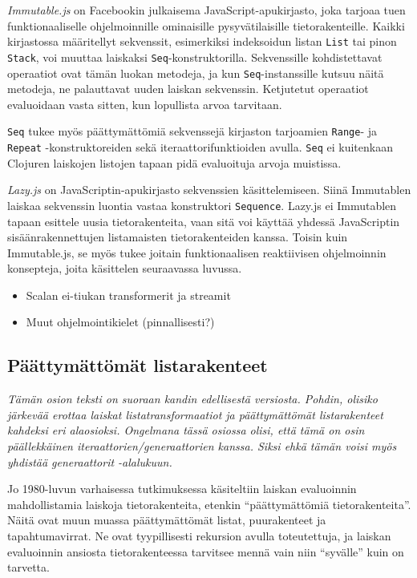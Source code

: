 \textit{Immutable.js} on Facebookin julkaisema JavaScript-apukirjasto, joka tarjoaa tuen funktionaaliselle ohjelmoinnille ominaisille pysyvätilaisille tietorakenteille. Kaikki kirjastossa määritellyt sekvenssit, esimerkiksi indeksoidun listan \verb!List! tai pinon \verb!Stack!, voi muuttaa laiskaksi \verb!Seq!-konstruktorilla. Sekvenssille kohdistettavat operaatiot ovat tämän luokan metodeja, ja kun \verb!Seq!-instanssille kutsuu näitä metodeja, ne palauttavat uuden laiskan sekvenssin. Ketjutetut operaatiot evaluoidaan vasta sitten, kun lopullista arvoa tarvitaan.

\begin{sloppypar}
\verb!Seq! tukee myös päättymättömiä sekvenssejä kirjaston tarjoamien \verb!Range!- ja \verb!Repeat! \mbox{-konstruktoreiden} sekä iteraattorifunktioiden avulla. \verb!Seq! ei kuitenkaan Clojuren laiskojen listojen tapaan pidä evaluoituja arvoja muistissa.
\end{sloppypar}

\textit{Lazy.js} on JavaScriptin-apukirjasto sekvenssien käsittelemiseen. Siinä Immutablen laiskaa sekvenssin luontia vastaa konstruktori \verb!Sequence!. Lazy.js ei Immutablen tapaan esittele uusia tietorakenteita, vaan sitä voi käyttää yhdessä JavaScriptin sisäänrakennettujen listamaisten tietorakenteiden kanssa. Toisin kuin Immutable.js, se myös tukee joitain funktionaalisen reaktiivisen ohjelmoinnin konsepteja, joita käsittelen seuraavassa luvussa.

\begin{itemize}
	\item Scalan ei-tiukan transformerit ja streamit
	\item Muut ohjelmointikielet (pinnallisesti?)
\end{itemize}

\subsection{Päättymättömät listarakenteet}

\textit{Tämän osion teksti on suoraan kandin edellisestä versiosta. Pohdin, olisiko järkevää erottaa laiskat listatransformaatiot ja päättymättömät listarakenteet kahdeksi eri alaosioksi. Ongelmana tässä osiossa olisi, että tämä on osin päällekkäinen iteraattorien/generaattorien kanssa. Siksi ehkä tämän voisi myös yhdistää generaattorit -alalukuun. }

Jo 1980-luvun varhaisessa tutkimuksessa käsiteltiin laiskan evaluoinnin mahdollistamia laiskoja tietorakenteita, etenkin ``päättymättömiä tietorakenteita''. Näitä ovat muun muassa päättymättömät listat, puurakenteet ja tapahtumavirrat. Ne ovat tyypillisesti rekursion avulla toteutettuja, ja laiskan evaluoinnin ansiosta tietorakenteessa tarvitsee mennä vain niin ``syvälle'' kuin on tarvetta.

